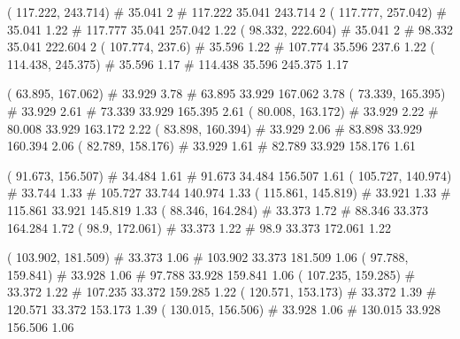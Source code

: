 \documentclass[a4paper,openbib,10pt]{article}
\newenvironment{treegraph}{\begin{graph}}{\end{graph}}
\begin{document}
\begin{treegraph}
  ( 117.222, 243.714) #     35.041    2
   #    117.222    35.041    243.714    2
  ( 117.777, 257.042) #     35.041    1.22
   #    117.777    35.041    257.042    1.22
  ( 98.332, 222.604) #     35.041    2
   #    98.332    35.041    222.604    2
  ( 107.774, 237.6) #     35.596    1.22
   #    107.774    35.596    237.6    1.22
  ( 114.438, 245.375) #     35.596    1.17
   #    114.438    35.596    245.375    1.17

  ( 63.895, 167.062) #     33.929    3.78
   #    63.895    33.929    167.062    3.78
  ( 73.339, 165.395) #     33.929    2.61
   #    73.339    33.929    165.395    2.61
  ( 80.008, 163.172) #     33.929    2.22
   #    80.008    33.929    163.172    2.22
  ( 83.898, 160.394) #     33.929    2.06
   #    83.898    33.929    160.394    2.06
  ( 82.789, 158.176) #     33.929    1.61
   #    82.789    33.929    158.176    1.61

  ( 91.673, 156.507) #     34.484    1.61
   #    91.673    34.484    156.507    1.61
  ( 105.727, 140.974) #     33.744    1.33
   #    105.727    33.744    140.974    1.33
  ( 115.861, 145.819) #     33.921    1.33
   #    115.861    33.921    145.819    1.33
  ( 88.346, 164.284) #     33.373    1.72
   #    88.346    33.373    164.284    1.72
  ( 98.9, 172.061) #     33.373    1.22
   #    98.9    33.373    172.061    1.22

  ( 103.902, 181.509) #     33.373    1.06
   #    103.902    33.373    181.509    1.06
  ( 97.788, 159.841) #     33.928    1.06
   #    97.788    33.928    159.841    1.06
  ( 107.235, 159.285) #     33.372    1.22
   #    107.235    33.372    159.285    1.22
  ( 120.571, 153.173) #     33.372    1.39
   #    120.571    33.372    153.173    1.39
  ( 130.015, 156.506) #     33.928    1.06
   #    130.015    33.928    156.506    1.06


\end{treegraph}
\end{document}
